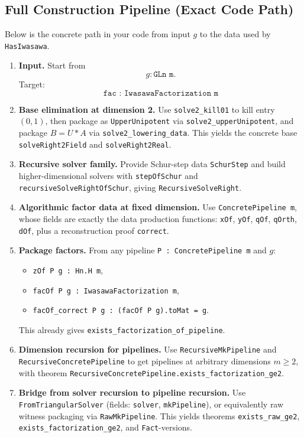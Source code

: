 \documentclass[11pt]{article}
\begin{document}
\subsection*{Full Construction Pipeline (Exact Code Path)}
Below is the concrete path in your code from input \(g\) to the data used by
\texttt{HasIwasawa}.
\begin{enumerate}[leftmargin=1.5em]
\item \textbf{Input.}
Start from
\[
g : \texttt{GLn m}.
\]
Target:
\[
\texttt{fac : IwasawaFactorization m}
\]
\item \textbf{Base elimination at dimension 2.}
Use \texttt{solve2\_kill01} to kill entry \((0,1)\), then package as
\texttt{UpperUnipotent} via \texttt{solve2\_upperUnipotent}, and package
\(B=U*A\) via \texttt{solve2\_lowering\_data}. This yields the concrete base
\texttt{solveRight2Field} and \texttt{solveRight2Real}.

\item \textbf{Recursive solver family.}
Provide Schur-step data \texttt{SchurStep} and build higher-dimensional solvers
with \texttt{stepOfSchur} and \texttt{recursiveSolveRightOfSchur}, giving
\texttt{RecursiveSolveRight}.

\item \textbf{Algorithmic factor data at fixed dimension.}
Use \texttt{ConcretePipeline m}, whose fields are exactly the data production
functions:
\texttt{xOf}, \texttt{yOf}, \texttt{qOf}, \texttt{qOrth}, \texttt{dOf},
plus a reconstruction proof \texttt{correct}.

\item \textbf{Package factors.}
From any pipeline \texttt{P : ConcretePipeline m} and \(g\):
\begin{itemize}[leftmargin=1.5em]
\item \texttt{zOf P g : Hn.H m},
\item \texttt{facOf P g : IwasawaFactorization m},
\item \texttt{facOf\_correct P g : (facOf P g).toMat = g}.
\end{itemize}
This already gives \texttt{exists\_factorization\_of\_pipeline}.

\item \textbf{Dimension recursion for pipelines.}
Use \texttt{RecursiveMkPipeline} and \texttt{RecursiveConcretePipeline} to get
pipelines at arbitrary dimensions \(m \ge 2\), with theorem
\texttt{RecursiveConcretePipeline.exists\_factorization\_ge2}.

\item \textbf{Bridge from solver recursion to pipeline recursion.}
Use \texttt{FromTriangularSolver} (fields: \texttt{solver}, \texttt{mkPipeline}),
or equivalently raw witness packaging via \texttt{RawMkPipeline}.
This yields theorems
\texttt{exists\_raw\_ge2}, \texttt{exists\_factorization\_ge2},
and \texttt{Fact}-versions.


\end{enumerate}
\end{document}

